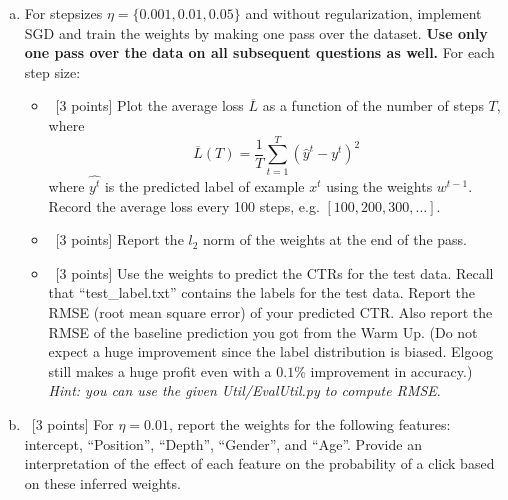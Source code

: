 \documentclass[12pt]{article}
\begin{document}
{\begin{enumerate}[(a)]
  \item  For stepsizes $\eta = \{0.001, 0.01, 0.05\}$ and without regularization, implement SGD and train the weights by making one pass over the dataset. \textbf{Use only one pass over the data on all subsequent questions as well.}  For each step size:
    \begin{itemize}
      \item ~[3 points]  Plot the average loss $\overline{L}$ as a function of the number of steps $T$, where
        \[
        \overline{L}(T) = \frac{1}{T} \sum_{t=1}^T (\hat{y}^t-y^t)^2
        \]
        where $\hat{y^t}$ is the predicted label of example $x^t$ using the weights $w^{t-1}$.
        Record the average loss every 100 steps, e.g. $[100, 200, 300, \dots]$.

      \item ~[3 points] Report the $l_2$ norm of the weights at the end of the pass.
      \item ~[3 points] Use the weights to predict the CTRs for the test data. Recall that ``test\_label.txt'' contains the labels for the test data.
             Report the RMSE (root mean square error) of your predicted CTR.   
             Also report the RMSE of the baseline prediction you got from the Warm Up.  (Do not expect a huge improvement since the label distribution is biased. Elgoog still makes a huge profit even with a $0.1\%$ improvement in accuracy.)
             \\
            \emph{Hint: you can use the given Util/EvalUtil.py to compute RMSE}.
    \end{itemize}
    \item ~[3 points] For $\eta = 0.01$, report the weights for the following features: intercept, ``Position'', ``Depth'', ``Gender'', and ``Age''. Provide an interpretation of the effect of each feature on the probability of a click based on these inferred weights.
\end{enumerate}

}
\end{document}
